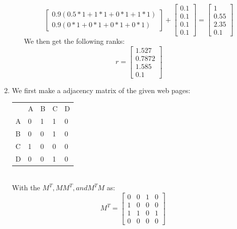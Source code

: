 \documentclass{article}
\begin{document}
\begin{enumerate}[label=(\alph*)]
\begin{enumerate}[label=(\roman*)]
\begin{equation*}
\begin{bmatrix}
            0.9(0.5*1 + 1*1 + 0*1 + 1*1)\\
            0.9(0*1 + 0*1 + 0*1 + 0*1)
        \end{bmatrix}
        + \begin{bmatrix}
            0.1 \\
            0.1 \\
            0.1 \\
            0.1
        \end{bmatrix}
        = \begin{bmatrix}
            1 \\
            0.55 \\
            2.35 \\
            0.1
        \end{bmatrix}
    \end{equation*}
    We then get the following ranks:
    \begin{equation*}
        r = \begin{bmatrix}
            1.527 \\
            0.7872 \\
            1.585 \\
            0.1
        \end{bmatrix}
    \end{equation*}
    \end{enumerate}
    \item We first make a adjacency matrix of the given web pages:
    \begin{table}[h]
        \begin{tabular}{lllll}
          & A   & B & C     & D \\
        A & 0   & 1 & 1     & 0 \\
        B & 0   & 0 & 1     & 0 \\
        C & 1   & 0 & 0     & 0 \\
        D & 0   & 0 & 1     & 0
        \end{tabular}
        \centering
    \end{table}
    \\With the $M^T, MM^T, and M^TM$ as:
    \begin{equation*}
        M^T =
        \begin{bmatrix}
        0   & 0 & 1     & 0 \\
        1   & 0 & 0     & 0 \\
        1   & 1 & 0     & 1 \\
        0   & 0 & 0     & 0

\end{bmatrix}
\end{equation*}
\end{enumerate}
\end{document}
